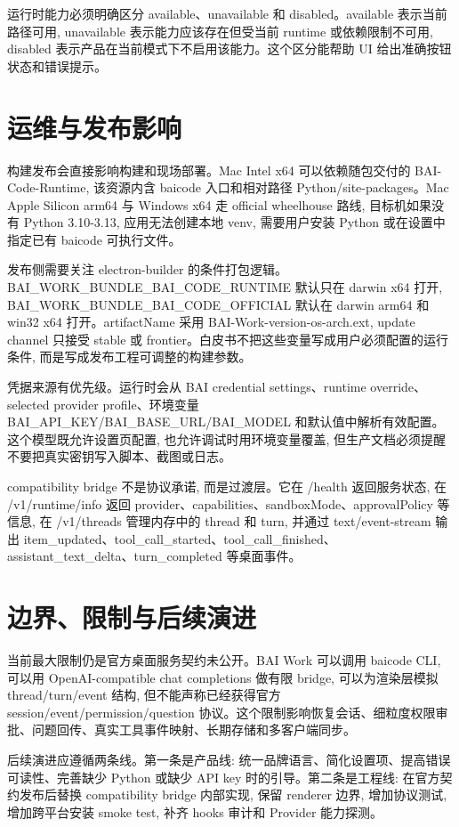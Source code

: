 运行时能力必须明确区分 available、unavailable 和 disabled。available 表示当前路径可用, unavailable 表示能力应该存在但受当前 runtime 或依赖限制不可用, disabled 表示产品在当前模式下不启用该能力。这个区分能帮助 UI 给出准确按钮状态和错误提示。

\section{运维与发布影响}
构建发布会直接影响构建和现场部署。Mac Intel x64 可以依赖随包交付的 BAI-Code-Runtime, 该资源内含 baicode 入口和相对路径 Python/site-packages。Mac Apple Silicon arm64 与 Windows x64 走 official wheelhouse 路线, 目标机如果没有 Python 3.10-3.13, 应用无法创建本地 venv, 需要用户安装 Python 或在设置中指定已有 baicode 可执行文件。

发布侧需要关注 electron-builder 的条件打包逻辑。BAI\_WORK\_BUNDLE\_BAI\_CODE\_RUNTIME 默认只在 darwin x64 打开, BAI\_WORK\_BUNDLE\_BAI\_CODE\_OFFICIAL 默认在 darwin arm64 和 win32 x64 打开。artifactName 采用 BAI-Work-{version}-{os}-{arch}.{ext}, update channel 只接受 stable 或 frontier。白皮书不把这些变量写成用户必须配置的运行条件, 而是写成发布工程可调整的构建参数。

凭据来源有优先级。运行时会从 BAI credential settings、runtime override、selected provider profile、环境变量 BAI\_API\_KEY/BAI\_BASE\_URL/BAI\_MODEL 和默认值中解析有效配置。这个模型既允许设置页配置, 也允许调试时用环境变量覆盖, 但生产文档必须提醒不要把真实密钥写入脚本、截图或日志。

compatibility bridge 不是协议承诺, 而是过渡层。它在 /health 返回服务状态, 在 /v1/runtime/info 返回 provider、capabilities、sandboxMode、approvalPolicy 等信息, 在 /v1/threads 管理内存中的 thread 和 turn, 并通过 text/event-stream 输出 item\_updated、tool\_call\_started、tool\_call\_finished、assistant\_text\_delta、turn\_completed 等桌面事件。

\section{边界、限制与后续演进}
当前最大限制仍是官方桌面服务契约未公开。BAI Work 可以调用 baicode CLI, 可以用 OpenAI-compatible chat completions 做有限 bridge, 可以为渲染层模拟 thread/turn/event 结构, 但不能声称已经获得官方 session/event/permission/question 协议。这个限制影响恢复会话、细粒度权限审批、问题回传、真实工具事件映射、长期存储和多客户端同步。

后续演进应遵循两条线。第一条是产品线: 统一品牌语言、简化设置项、提高错误可读性、完善缺少 Python 或缺少 API key 时的引导。第二条是工程线: 在官方契约发布后替换 compatibility bridge 内部实现, 保留 renderer 边界, 增加协议测试, 增加跨平台安装 smoke test, 补齐 hooks 审计和 Provider 能力探测。


